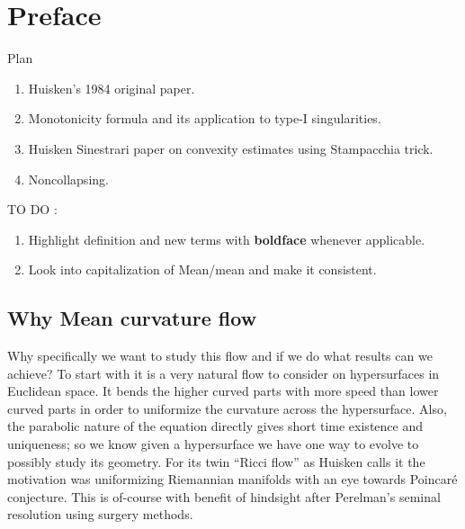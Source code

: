 \chapter{Preface}Plan 

\begin{enumerate}
    \item Huisken's 1984 original paper.
    \item Monotonicity formula and its application to type-I singularities.
    \item Huisken Sinestrari paper on convexity estimates using Stampacchia trick.
    \item Noncollapsing.
\end{enumerate}

TO DO : \begin{enumerate}
    \item Highlight definition and new terms with \textbf{boldface} whenever applicable. 
    \item Look into capitalization of Mean/mean and make it consistent. 
\end{enumerate}

    \section*{Why Mean curvature flow}

Why specifically we want to study this flow and if we do what results can we achieve? To start with it is a very natural flow to consider on hypersurfaces in Euclidean space. It bends the higher curved parts with more speed than lower curved parts in order to uniformize the curvature across the hypersurface. Also, the parabolic nature of the equation directly gives short time existence and uniqueness; so we know given a hypersurface we have one way to evolve to possibly study its geometry. For its twin ``Ricci flow'' as Huisken calls it the motivation was uniformizing Riemannian manifolds with an eye towards Poincar\'e conjecture. This is of-course with benefit of hindsight after Perelman's seminal resolution using surgery methods. 

